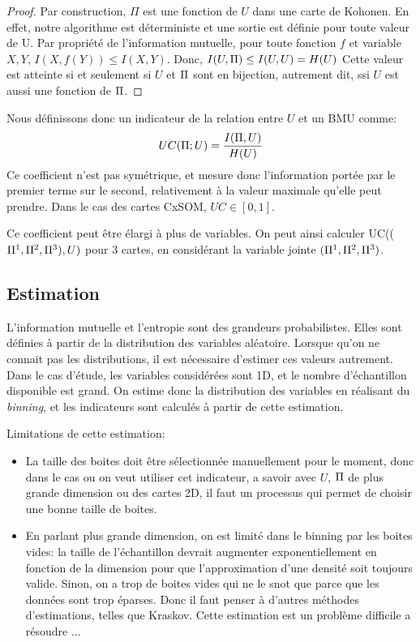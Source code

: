 \begin{proof}
Par construction, $\Pi$ est une fonction de $U$ dans une carte de Kohonen. En effet, notre algorithme est déterministe et une sortie est définie pour toute valeur de U. 
Par propriété de l'information mutuelle, pour toute fonction $f$ et variable $X,Y$, $I(X,f(Y)) \leq I(X,Y) $.
Donc, $I(U,\Pi) \leq I(U,U) = H(U)$
Cette valeur est atteinte si et seulement si $U$ et $\Pi$ sont en bijection, autrement dit, ssi $U$ est aussi une fonction de $\Pi$.
\end{proof}

Nous définissons donc un indicateur de la relation entre $U$ et un BMU comme:
\begin{equation}
UC(\Pi;U) = \frac{I(\Pi,U)}{H(U)}
\end{equation}
Ce coefficient n'est pas symétrique, et mesure donc l'information portée par le premier terme sur le second, relativement à la valeur maximale qu'elle peut prendre. Dans le cas des cartes CxSOM, $UC \in [0,1]$. 

Ce coefficient peut être élargi à plus de variables. On peut ainsi calculer UC(($\Pi^1,\Pi^2,\Pi^3),U)$ pour 3 cartes, en considérant la variable jointe $(\Pi^1,\Pi^2,\Pi^3)$.

\subsection{Estimation}

L'information mutuelle et l'entropie sont des grandeurs probabilistes. Elles sont définies à partir de la distribution des variables aléatoire. Lorsque qu'on ne connait pas les distributions, il est nécessaire d'estimer ces valeurs autrement. 
Dans le cas d'étude, les variables considérées sont 1D, et le nombre d'échantillon disponible est grand. On estime donc la distribution des variables en réalisant du \emph{binning}, et les indicateurs sont calculés à partir de cette estimation.

Limitations de cette estimation:
\begin{itemize}
\item La taille des boites doit être sélectionnée manuellement pour le moment, donc dans le cas ou on veut utiliser cet indicateur, a savoir avec $U$, $\Pi$ de plus grande dimension ou des cartes 2D, il faut un processus qui permet de choisir une bonne taille de boites.
\item En parlant plus grande dimension, on est limité dans le binning par les boites vides: la taille de l'échantillon devrait augmenter exponentiellement en fonction de la dimension pour que l'approximation d'une densité soit toujours valide. Sinon, on a trop de boites vides qui ne le snot que parce que les données sont trop éparses. Donc il faut penser à d'autres méthodes d'estimations, telles que Kraskov. Cette estimation est un problème difficile a résoudre ...
\end{itemize}

